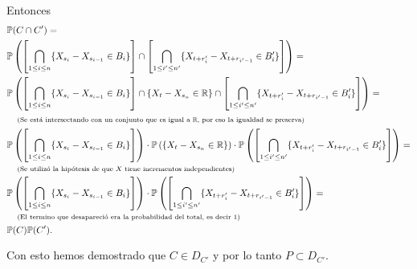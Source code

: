 Entonces
\tiny               
\begin{align}
    &   \mathbb{P}(C \cap C')                                                                                                                                                                                                                                                   =   \\
    &   \mathbb{P}\left( \left[ \bigcap_{1 \leq i\leq n} \{ X_{s_i} - X_{s_{i-1}} \in B_i \} \right] \cap \left[ \bigcap_{1 \leq i' \leq n'} \{  X_{t + r_i'} - X_{t + r_{i' - 1}} \in B_i' \} \right] \right)                                                                  =   \\
    &   \mathbb{P}\left( \left[ \bigcap_{1 \leq i\leq n} \{ X_{s_i} - X_{s_{i-1}} \in B_i \} \right] \cap \{X_t - X_{s_n} \in \mathbb{R}\} \cap \left[ \bigcap_{1 \leq i' \leq n'} \{  X_{t + r_i'} - X_{t + r_{i' - 1}} \in B_i' \} \right] \right)                                    =   \\
    &   \;\;\;\;\mbox{{\scriptsize(Se está intersectando con un conjunto que es igual a $\mathbb{R}$, por eso la igualdad se preserva)}}                                                                                                                                                                \\
    &   \mathbb{P}\left( \left[ \bigcap_{1 \leq i\leq n} \{ X_{s_i} - X_{s_{i-1}} \in B_i \} \right] \right) \cdot \mathbb{P}\left( \{X_t - X_{s_n} \in \mathbb{R}\} \right) \cdot \mathbb{P}\left(\left[ \bigcap_{1 \leq i' \leq n'} \{  X_{t + r_i'} - X_{t + r_{i' - 1}} \in B_i' \} \right] \right) =   \\
    &   \;\;\;\;\mbox{{\scriptsize(Se utilizó la hipótesis de que $X$ tiene incrementos independientes)}}                                                                                                                                                                                       \\
    &   \mathbb{P}\left( \left[ \bigcap_{1 \leq i\leq n} \{ X_{s_i} - X_{s_{i-1}} \in B_i \} \right] \right) \cdot \mathbb{P}\left(\left[ \bigcap_{1 \leq i' \leq n'} \{  X_{t + r_i'} - X_{t + r_{i' - 1}} \in B_i' \} \right] \right)                                                 =   \\
    &   \;\;\;\;\mbox{{\scriptsize(El termino que desapareció era la probabilidad del total, es decir $1$)}}                                                                                                                                                                                    \\
    &   \mathbb{P}(C) \mathbb{P}(C').
\end{align}\pn
\normalsize

Con esto hemos demostrado que $C \in D_{C'}$ y por lo tanto $P \subset D_{C'}$.
